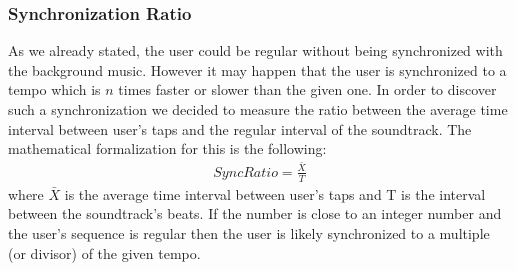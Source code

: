 \subsubsection*{Synchronization Ratio}
As we already stated, the user could be regular without being synchronized with the background music. However it may happen that the user is synchronized to a tempo which is $n$ times faster or slower than the given one.
In order to discover such a synchronization we decided to measure the ratio between the average time interval between user's taps and the regular interval of the soundtrack. The mathematical formalization for this is the following:
\begin{align}
	SyncRatio = \frac{\bar{X}}{T}
\end{align}
where $\bar{X}$ is the average time interval between user's taps and T is the interval between the soundtrack's beats.
If the number is close to an integer number and the user's sequence is regular then the user is likely synchronized to a multiple (or divisor) of the given tempo.